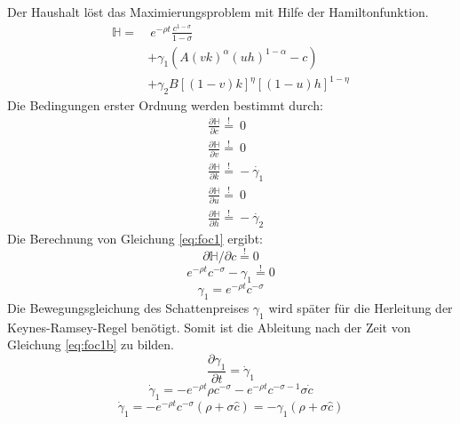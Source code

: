 Der Haushalt löst das Maximierungsproblem mit Hilfe der Hamiltonfunktion.\\
\begin{equation}
\begin{split}\mathbb{H}=&~e^{-\rho t}\frac{c^{1-\sigma}}{1-\sigma}\\
&+\gamma_1(A(vk)^\alpha(uh)^{1-\alpha}-c)\\
&+\gamma_2B[(1-v)k]^{\eta}[(1-u)h]^{1-\eta}\end{split}
\end{equation}
Die Bedingungen erster Ordnung werden bestimmt durch:\\
\begin{align}
&\frac{\partial\mathbb{H}}{\partial c}\overset{!}{=}~0\label{eq:foc1}\\
&\frac{\partial\mathbb{H}}{\partial v}\overset{!}{=}~0\label{eq:foc2}\\
&\frac{\partial\mathbb{H}}{\partial k}\overset{!}{=}-\dot{\gamma_1}\label{eq:foc3}\\
&\frac{\partial\mathbb{H}}{\partial u}\overset{!}{=}~0\label{eq:foc4}\\
&\frac{\partial\mathbb{H}}{\partial h}\overset{!}{=}-\dot{\gamma_2}\label{eq:foc5}\end{align}
Die Berechnung von Gleichung \eqref{eq:foc1} ergibt:\\
\begin{equation*}
\partial\mathbb{H}/\partial c\overset{!}{=}0
\end{equation*}
\begin{equation}
e^{-\rho t}c^{-\sigma}-\gamma_1 \overset{!}{=} 0\label{eq:foc1a}
\end{equation}
\vspace{-0.7cm}
\begin{equation}
\gamma_1 = e^{-\rho t}c^{-\sigma}\label{eq:foc1b}
\end{equation}
Die Bewegungsgleichung des Schattenpreises $\gamma_1$ wird später für die Herleitung der  Keynes-Ramsey-Regel benötigt. Somit ist die Ableitung nach der Zeit von Gleichung \eqref{eq:foc1b} zu bilden.
\begin{equation}\frac{\partial\gamma_1}{\partial t} = \dot{\gamma}_{1}\end{equation}
\begin{equation*}
		\dot{\gamma}_{1} = -e^{-\rho t}\rho c^{-\sigma}-e^{-\rho t}c^{-\sigma-1}\sigma\dot{c}
\end{equation*}
\vspace{-0.7cm}
\begin{equation}
\dot{\gamma}_{1} = -e^{-\rho t}c^{-\sigma}(\rho+\sigma\hat{c}) = -\gamma_1(\rho+\sigma\hat{c})\label{eq:foc1c}
\end{equation}
